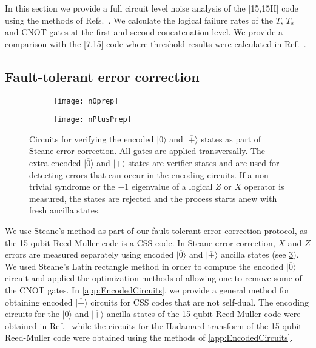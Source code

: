 \documentclass[pra,longbibliography,twocolumn,showpacs,nofootinbib,superscriptaddress,notitlepage]{revtex4-1}
\newcommand{\ket}[1]{|#1\rangle}  %
\begin{document}
In this section we provide a full circuit level noise analysis of the [15,15H] code using the methods of Refs.~\cite{PR12,CJL16,CJL16b}. We calculate the logical failure rates of the $T$, $T_x$ and CNOT gates at the first and second concatenation level. We provide a comparison with the [7,15] code where threshold results were calculated in Ref.~\cite{CJL16}. 

\subsection{Fault-tolerant error correction}
\label{subsec:StatePrep}

\begin{figure}%
\centering
\begin{subfigure}{0.35\textwidth}
\texttt{[image: nOprep]}
\caption{}
\label{fig:nOprep}
\end{subfigure}
\begin{subfigure}{0.35\textwidth}
\texttt{[image: nPlusPrep]}
\caption{}
\label{fig:nPlusPrep}
\end{subfigure}
\caption{Circuits for verifying the encoded $\ket{\overline{0}}$ and $\ket{\overline{+}}$ states as part of Steane error correction. All gates are applied transversally. The extra encoded $\ket{\overline{0}}$ and $\ket{\overline{+}}$ states are verifier states and are used for detecting errors that can occur in the encoding circuits.  If a non-trivial syndrome or the $-1$ eigenvalue of a logical $Z$ or $X$ operator is measured, the states are rejected and the process starts anew with fresh ancilla states.}
\label{fig:nPrep}
\end{figure}

We use Steane's method as part of our fault-tolerant error correction protocol, as the 15-qubit Reed-Muller code is a CSS code. In Steane error correction, $X$ and $Z$ errors are measured separately using encoded $\ket{\overline{0}}$ and $\ket{\overline{+}}$ ancilla states (see \cref{fig:nPrep}). We used Steane's Latin rectangle method \cite{Steane02} in order to compute the encoded $\ket{\overline{0}}$ circuit and applied the optimization methods of \cite{PR12,CJL16b} allowing one to remove some of the CNOT gates. In \cref{app:EncodedCircuits}, we provide a general method for obtaining encoded $\ket{\overline{+}}$ circuits for CSS codes that are not self-dual. The encoding circuits for the $\ket{\overline{0}}$ and $\ket{\overline{+}}$ ancilla states of the 15-qubit Reed-Muller code were obtained in Ref.~\cite{CJL16b} while the circuits for the Hadamard transform of the 15-qubit Reed-Muller code were obtained using the methods of \cref{app:EncodedCircuits}.
\end{document}
